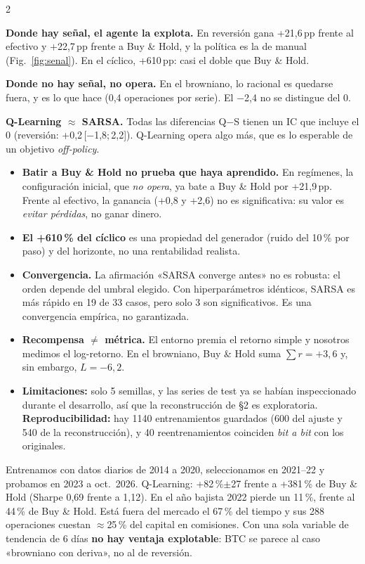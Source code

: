 \documentclass[10pt,a4paper]{article}
\newcommand{\sect}[1]{\par\vspace{3pt}{\large\bfseries #1}\par\vspace{1pt}}
\newcommand{\ic}[2]{{\scriptsize\,[#1;\,#2]}}
\begin{document}
\begin{multicols}{2}

\sect{3. Lectura de los resultados}
\textbf{Donde hay señal, el agente la explota.} En reversión gana +21,6\,pp frente al efectivo y +22,7\,pp frente a Buy \& Hold, y la política es la de manual (Fig.~\ref{fig:senal}).
En el cíclico, +610\,pp: casi el doble que Buy \& Hold.

\textbf{Donde no hay señal, no opera.} En el browniano, lo racional es quedarse fuera, y es lo que hace (0,4 operaciones por serie). El $-$2,4 no se distingue del 0.

\textbf{Q-Learning $\approx$ SARSA.} Todas las diferencias Q$-$S tienen un IC que incluye el 0 (reversión: +0,2\ic{$-$1,8}{2,2}).
Q-Learning opera algo más, que es lo esperable de un objetivo \emph{off-policy}.

\sect{4. Análisis crítico}
\begin{itemize}
\item \textbf{Batir a Buy \& Hold no prueba que haya aprendido.} En regímenes, la configuración inicial, que \emph{no opera}, ya bate a Buy \& Hold por +21,9\,pp. Frente al efectivo, la ganancia (+0,8 y +2,6) no es significativa: su valor es \emph{evitar pérdidas}, no ganar dinero.
\item \textbf{El +610\,\% del cíclico} es una propiedad del generador (ruido del 10\,\% por paso) y del horizonte, no una rentabilidad realista.
\item \textbf{Convergencia.} La afirmación «SARSA converge antes» no es robusta: el orden depende del umbral elegido. Con hiperparámetros idénticos, SARSA es más rápido en 19 de 33 casos, pero solo 3 son significativos. Es una convergencia empírica, no garantizada.
\item \textbf{Recompensa $\neq$ métrica.} El entorno premia el retorno simple y nosotros medimos el log-retorno. En el browniano, Buy \& Hold suma $\sum r=+3{,}6$ y, sin embargo, $L=-6{,}2$.
\item \textbf{Limitaciones:} solo 5 semillas, y las series de test ya se habían inspeccionado durante el desarrollo, así que la reconstrucción de §2 es exploratoria.
\textbf{Reproducibilidad:} hay 1140 entrenamientos guardados (600 del ajuste y 540 de la reconstrucción), y 40 reentrenamientos coinciden \emph{bit a bit} con los originales.
\end{itemize}

\sect{5. Más allá: BTC-USD real}
Entrenamos con datos diarios de 2014 a 2020, seleccionamos en 2021--22 y probamos en 2023 a oct.\ 2026.
Q-Learning: +82\,\%$\pm$27 frente a +381\,\% de Buy \& Hold (Sharpe 0,69 frente a 1,12). En el año bajista 2022 pierde un 11\,\%, frente al 44\,\% de Buy \& Hold.
Está fuera del mercado el 67\,\% del tiempo y sus 288 operaciones cuestan $\approx$25\,\% del capital en comisiones.
Con una sola variable de tendencia de 6 días \textbf{no hay ventaja explotable}: BTC se parece al caso «browniano con deriva», no al de reversión.


\end{multicols}
\end{document}

